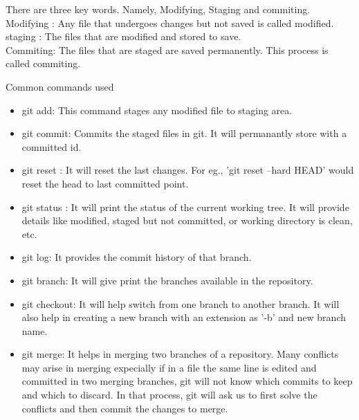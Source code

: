 \documentclass{article}
\begin{document}
\begin{section}
There are three key words. Namely, Modifying, Staging and commiting.\\
Modifying : Any file that undergoes changes but not saved is called modified.\\
staging : The files that are modified and stored to save.\\
Commiting: The files that are staged are saved permanently. This process is called commiting.\\
\end{section}
\begin{section}{Common commands used}
\begin{itemize}
\item git add: This command stages any modified file to staging area.
\item git commit: Commits the staged files in git. It will permanantly store with a committed id.
\item git reset : It will reset the last changes. For eg., 'git reset --hard HEAD' would reset the head to last committed point.
\item git status : It will print the status of the current working tree. It will provide details like modified, staged but not committed, or working directory is clean, etc.
\item git log: It provides the commit history of that branch. 
\item git branch: It will give print the branches available in the repository.
\item git checkout: It will help switch from one branch to another branch. It will also help in creating a new branch with an extension as '-b' and new branch name.
\item git merge: It helps in merging two branches of a repository. Many conflicts may arise in merging expecially if in a file the same line is edited and committed in two merging branches, git will not know which commits to keep and which to discard. In that process, git will ask us to first solve the conflicts and then commit the changes to merge.

\end{itemize}
\end{section}
\end{document}
